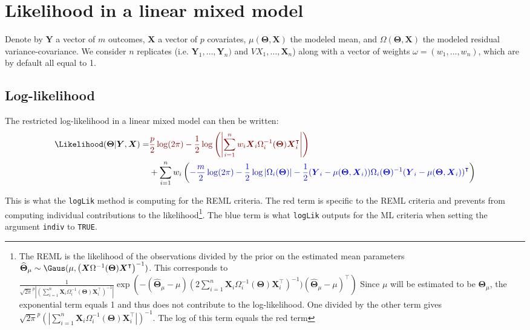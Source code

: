 \documentclass[12pt]{article}
\newcommand{\darkblue}{blue!80!black}
\newcommand{\darkred}{red!50!black}
\newcommand\trans[1]{{#1}^\intercal}%
\newcommand{\param}{\Theta}
\newcommand{\paramHat}{\widehat{\param}}
\newcommand{\Vparam}{\boldsymbol{\param}}
\newcommand{\VparamHat}{\boldsymbol{\paramHat}}
\newcommand{\VX}{\boldsymbol{X}}
\newcommand{\VY}{\boldsymbol{Y}}
\begin{document}
\section{Likelihood in a linear mixed model}
\label{SM:likelihood}
Denote by \(\VY\) a vector of \(m\) outcomes, \(\VX\) a vector of
\(p\) covariates, \(\mu(\Vparam,\VX)\) the modeled mean, and
\(\Omega(\Vparam,\VX)\) the modeled residual variance-covariance. We
consider \(n\) replicates (i.e. \(\VY_1,\ldots,\VY_n)\) and
\(VX_1,\ldots,\VX_n\)) along with a vector of weights
\(\omega=(w_1,\ldots,w_n)\), which are by default all equal to 1.
\subsection{Log-likelihood}
\label{SM:likelihood:log}
The restricted log-likelihood in a linear mixed model can then be
written:
\begin{align}
\Likelihood(\Vparam|\VY,\VX) =& \textcolor{\darkred}{ \frac{p}{2} \log(2\pi)-\frac{1}{2} \log\left(\left|\sum_{i=1}^n w_i \VX_i \Omega_i^{-1}(\Vparam) \trans{\VX}_i\right|\right)} \notag \\
& + \sum_{i=1}^{n} w_i \left(\textcolor{\darkblue}{-\frac{m}{2} \log(2\pi) - \frac{1}{2} \log\left|\Omega_i(\Vparam)\right| - \frac{1}{2} (\VY_i-\mu(\Vparam,\VX_i)) \Omega_i(\Vparam)^{-1} \trans{(\VY_i-\mu(\Vparam,\VX_i))}} \right)  \label{eq:log-likelihood}
\end{align}

This is what the \texttt{logLik} method is computing for the REML
criteria. The red term is specific to the REML criteria and prevents
from computing individual contributions to the likelihood\footnote{The REML is the
likelihood of the observations divided by the prior on the estimated
mean parameters \(\VparamHat_{\mu} \sim \Gaus(\mu,\left(\VX
 \Omega^{-1}(\Vparam) \trans{\VX}\right)^{-1})\). This corresponds to
\(\frac{1}{\sqrt{2\pi}^p \left|\left(\sum_{i=1}^n \VX_i
 \Omega_i^{-1}(\Vparam) \trans{\VX}_i\right)^{-1}\right|}
 \exp\left(-(\VparamHat_{\mu}-\mu)\left(2\sum_{i=1}^n \VX_i
 \Omega_i^{-1}(\Vparam)
 \trans{\VX}_i\right)^{-1})\trans{(\VparamHat_{\mu}-\mu)}\right)\)
Since \(\mu\) will be estimated to be \(\Vparam_{\mu}\), the
exponential term equals 1 and thus does not contribute to the
log-likelihood. One divided by the other term gives \(\sqrt{2\pi}^p
 \left(\left|\sum_{i=1}^n \VX_i \Omega_i^{-1}(\Vparam)
 \trans{\VX}_i\right|\right)^{-1}\). The log of this term equals the red
term}. The blue term is what \texttt{logLik} outputs for the ML criteria
when setting the argument \texttt{indiv} to \texttt{TRUE}.
\end{document}
